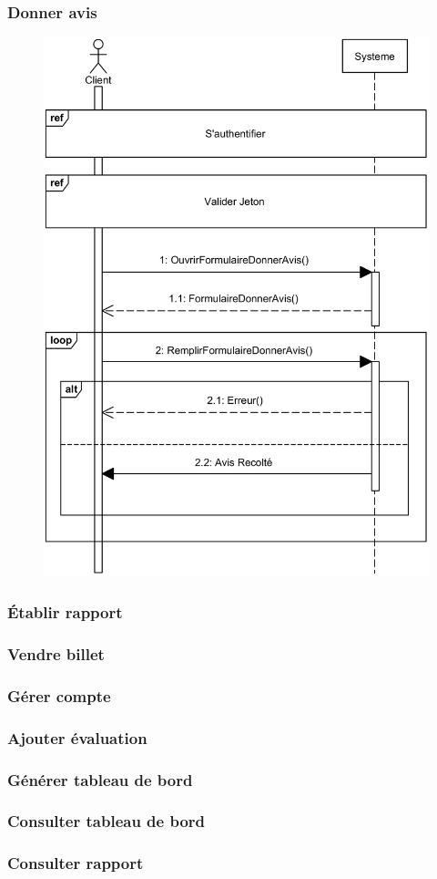     \subsubsection[Donner avis]{Donner avis}
        \begin{figure}[H]
            \centering
            \includegraphics[width=130mm]{images/sd-donner-avis.png}
            \label{fig:sdDonnerAvis}
        \end{figure}
\pagebreak
    \subsubsection[Établir rapport]{Établir rapport}
    \subsubsection[Vendre billet]{Vendre billet}
    \subsubsection[Gérer compte]{Gérer compte}
    \subsubsection[Ajouter évaluation]{Ajouter évaluation}
    \subsubsection[Générer tableau de bord]{Générer tableau de bord}
    \subsubsection[Consulter tableau de bord]{Consulter tableau de bord}
    \subsubsection[Consulter rapport]{Consulter rapport}